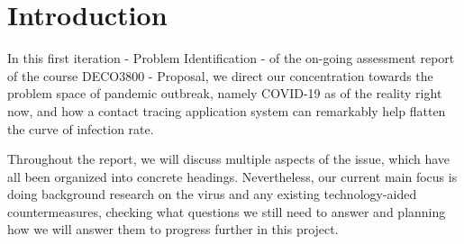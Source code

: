 \section{Introduction}
  \par In this first iteration - Problem Identification - of the on-going assessment report of the course DECO3800 - Proposal, we direct our concentration towards the problem space of pandemic outbreak, namely COVID-19 as of the reality right now, and how a contact tracing application system can remarkably help flatten the curve of infection rate.
  \par Throughout the report, we will discuss multiple aspects of the issue, which have all been organized into concrete headings. Nevertheless, our current main focus is doing background research on the virus and any existing technology-aided countermeasures, checking what questions we still need to answer and planning how we will answer them to progress further in this project.
